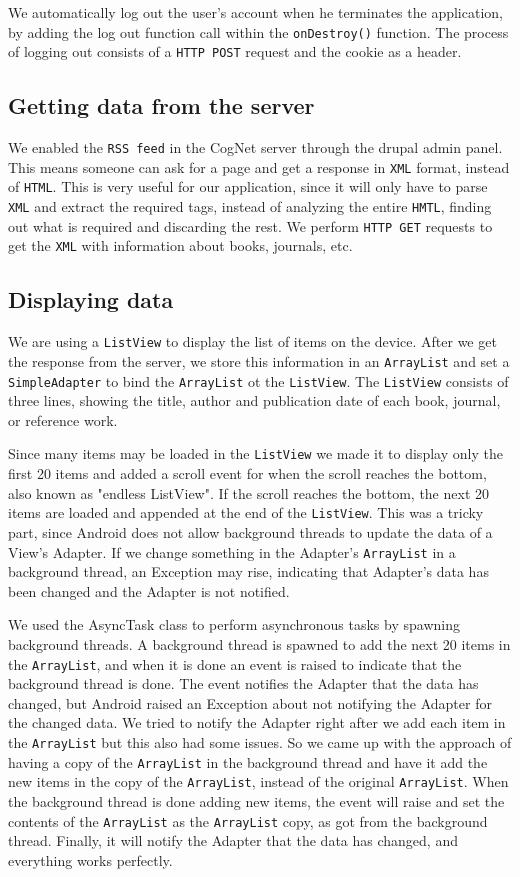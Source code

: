 \documentclass [a4paper, 11pt, oneside, final]{article}
\numberwithin{equation}{section}		%
\numberwithin{figure}{section}			%
\numberwithin{table}{section}				%
\begin{document}
We automatically log out the user's account when he terminates the application, by adding the log out function call within the {\tt onDestroy()} function. The process of logging out consists of a {\tt HTTP POST} request and the cookie as a header.


\subsection {Getting data from the server}
We enabled the {\tt RSS feed} in the CogNet server through the drupal admin panel. This means someone can ask for a page and get a response in {\tt XML} format, instead of {\tt HTML}. This is very useful for our application, since it will only have to parse {\tt XML} and extract the required tags, instead of analyzing the entire {\tt HMTL}, finding out what is required and discarding the rest. We perform {\tt HTTP GET} requests to get the {\tt XML} with information about books, journals, etc. 

\subsection {Displaying data}
We are using a {\tt ListView} to display the list of items on the device. After we get the response from the server, we store this information in an {\tt ArrayList} and set a {\tt SimpleAdapter} to bind the {\tt ArrayList} ot the {\tt ListView}. The {\tt ListView} consists of three lines, showing the title, author and publication date of each book, journal, or reference work.

Since many items may be loaded in the {\tt ListView} we made it to display only the first 20 items and added a scroll event for when the scroll reaches the bottom, also known as "endless ListView". If the scroll reaches the bottom, the next 20 items are loaded and appended at the end of the {\tt ListView}. This was a tricky part, since Android does not allow background threads to update the data of a View's Adapter. If we change something in the Adapter's {\tt ArrayList} in a background thread, an Exception may rise, indicating that Adapter's data has been changed and the Adapter is not notified. 

We used the AsyncTask class to perform asynchronous tasks by spawning background threads. A background thread is spawned to add the next 20 items in the {\tt ArrayList}, and when it is done an event is raised to indicate that the background thread is done. The event notifies the Adapter that the data has changed, but Android raised an Exception about not notifying the Adapter for the changed data. We tried to notify the Adapter right after we add each item in the {\tt ArrayList} but this also had some issues. So we came up with the approach of having a copy of the {\tt ArrayList} in the background thread and have it add the new items in the copy of the {\tt ArrayList}, instead of the original {\tt ArrayList}. When the background thread is done adding new items, the event will raise and set the contents of the {\tt ArrayList} as the {\tt ArrayList} copy, as got from the background thread. Finally, it will notify the Adapter that the data has changed, and everything works perfectly.
\end{document}
